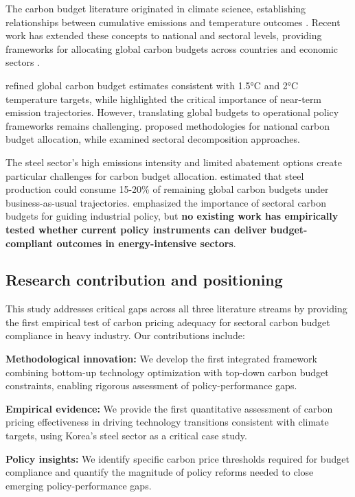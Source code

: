 \documentclass[preprint,1p,authoryear]{elsarticle}
\begin{document}
The carbon budget literature originated in climate science, establishing relationships between cumulative emissions and temperature outcomes \citep{matthews2009proportionality}. Recent work has extended these concepts to national and sectoral levels, providing frameworks for allocating global carbon budgets across countries \citep{raupach2014sharing} and economic sectors \citep{gasser2018negative}.

\citet{rogelj2019new} refined global carbon budget estimates consistent with 1.5°C and 2°C temperature targets, while \citet{millar2017emission} highlighted the critical importance of near-term emission trajectories. However, translating global budgets to operational policy frameworks remains challenging. \citet{robiou2019national} proposed methodologies for national carbon budget allocation, while \citet{kuramochi2018beyond} examined sectoral decomposition approaches.

The steel sector's high emissions intensity and limited abatement options create particular challenges for carbon budget allocation. \citet{bataille2018role} estimated that steel production could consume 15-20\% of remaining global carbon budgets under business-as-usual trajectories. \citet{Griffin2020} emphasized the importance of sectoral carbon budgets for guiding industrial policy, but \textbf{no existing work has empirically tested whether current policy instruments can deliver budget-compliant outcomes in energy-intensive sectors}.

\subsection{Research contribution and positioning}

This study addresses critical gaps across all three literature streams by providing the first empirical test of carbon pricing adequacy for sectoral carbon budget compliance in heavy industry. Our contributions include:

\textbf{Methodological innovation:} We develop the first integrated framework combining bottom-up technology optimization with top-down carbon budget constraints, enabling rigorous assessment of policy-performance gaps.

\textbf{Empirical evidence:} We provide the first quantitative assessment of carbon pricing effectiveness in driving technology transitions consistent with climate targets, using Korea's steel sector as a critical case study.

\textbf{Policy insights:} We identify specific carbon price thresholds required for budget compliance and quantify the magnitude of policy reforms needed to close emerging policy-performance gaps.
\end{document}
